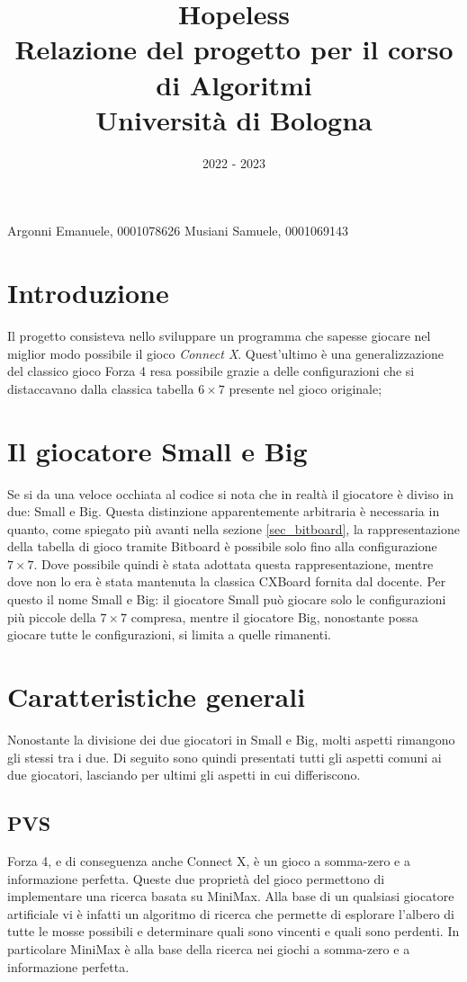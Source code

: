 \documentclass[a4paper]{article}
\title{\textbf{Hopeless}\\
\vspace{0.2cm}\normalsize Relazione del progetto per il corso di Algoritmi\\
\normalsize Università di Bologna}
\date{2022 - 2023}
\begin{document}
\maketitle

\begin{flushright}
  Argonni Emanuele, 0001078626\linebreak
  Musiani Samuele, 0001069143
\end{flushright}


\section{Introduzione}

Il progetto consisteva nello sviluppare un programma che sapesse giocare nel 
miglior modo possibile il gioco \emph{Connect X}. Quest'ultimo è una 
generalizzazione del classico gioco Forza 4 resa possibile grazie a delle 
configurazioni che si distaccavano dalla classica tabella $6 \times 7$ presente 
nel gioco originale;

\section{Il giocatore Small e Big}

Se si da una veloce occhiata al codice si nota che in realtà il giocatore è 
diviso in due: Small e Big. Questa distinzione apparentemente arbitraria è 
necessaria in quanto, come spiegato più avanti nella sezione \ref{sec_bitboard},
la rappresentazione della tabella di gioco tramite Bitboard è possibile solo 
fino alla configurazione $7 \times 7$. Dove possibile quindi è stata adottata 
questa rappresentazione, mentre dove non lo era è stata mantenuta la classica
CXBoard fornita dal docente. Per questo il nome Small e Big: il giocatore Small 
può giocare solo le configurazioni più piccole della $7 \times 7$ compresa, 
mentre il giocatore Big, nonostante possa giocare tutte le configurazioni, si 
limita a quelle rimanenti.

\section{Caratteristiche generali}

Nonostante la divisione dei due giocatori in Small e Big, molti aspetti 
rimangono gli stessi tra i due. Di seguito sono quindi presentati tutti gli 
aspetti comuni ai due giocatori, lasciando per ultimi gli aspetti in cui 
differiscono.

\subsection{PVS}
Forza 4, e di conseguenza anche Connect X, è un gioco a somma-zero e a
informazione perfetta. Queste due proprietà del gioco permettono di implementare
una ricerca basata su MiniMax. Alla base di un qualsiasi giocatore artificiale
vi è infatti un algoritmo di ricerca che permette di esplorare l'albero di tutte
le mosse possibili e determinare quali sono vincenti e quali sono perdenti. In
particolare MiniMax è alla base della ricerca nei giochi a somma-zero e a
informazione perfetta.
\end{document}
